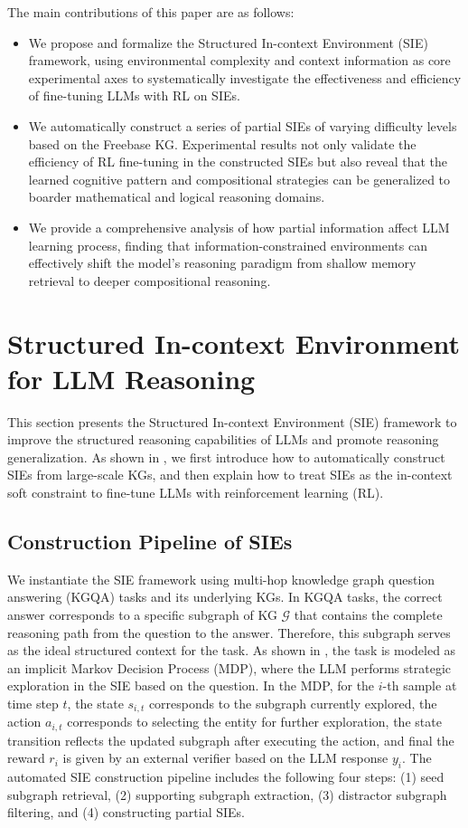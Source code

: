 \documentclass{article} %
\begin{document}
The main contributions of this paper are as follows:
\begin{itemize}
    \item We propose and formalize the Structured In-context Environment (SIE) framework, using environmental complexity and context information as core experimental axes to systematically investigate the effectiveness and efficiency of fine-tuning LLMs with RL on SIEs. 
    \item We automatically construct a series of partial SIEs of varying difficulty levels based on the Freebase KG. Experimental results not only validate the efficiency of RL fine-tuning in the constructed SIEs but also reveal that the learned cognitive pattern and compositional strategies can be generalized to boarder mathematical and logical reasoning domains. 
    \item We provide a comprehensive analysis of how partial information affect LLM learning process, finding that information-constrained environments can effectively shift the model's reasoning paradigm from shallow memory retrieval to deeper compositional reasoning. 
\end{itemize}





\section{Structured In-context Environment for LLM Reasoning}
This section presents the Structured In-context Environment (SIE) framework to improve the structured reasoning capabilities of LLMs and promote reasoning generalization. As shown in , we first introduce how to automatically construct SIEs from large-scale KGs, and then explain how to treat SIEs as the in-context soft constraint to fine-tune LLMs with reinforcement learning (RL).

\subsection{Construction Pipeline of SIEs}
\label{sec3.1}
We instantiate the SIE framework using multi-hop knowledge graph question answering (KGQA) tasks and its underlying KGs. In KGQA tasks, the correct answer corresponds to a specific subgraph of KG $\mathcal{G}$ that contains the complete reasoning path from the question to the answer. Therefore, this subgraph serves as the ideal structured context for the task. As shown in , the task is modeled as an implicit Markov Decision Process (MDP), where the LLM performs strategic exploration in the SIE based on the question. In the MDP, for the $i$-th sample at time step $t$, the state $s_{i,t}$ corresponds to the subgraph currently explored, the action $a_{i,t}$ corresponds to selecting the entity for further exploration, the state transition reflects the updated subgraph after executing the action, and final the reward $r_i$ is given by an external verifier based on the LLM response $y_i$. 
The automated SIE construction pipeline includes the following four steps: (1) seed subgraph retrieval, (2) supporting subgraph extraction, (3) distractor subgraph filtering, and (4) constructing partial SIEs.
\end{document}
